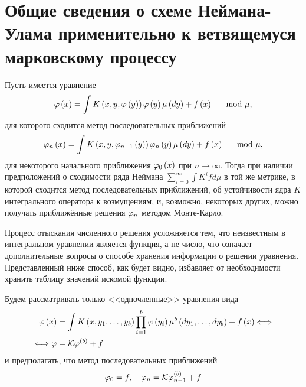 \section{Общие сведения о схеме Неймана-Улама применительно к ветвящемуся марковскому процессу}
Пусть имеется уравнение 
\begin{equation}
	\varphi\left(x\right) = \int K\left(x, y, \varphi\left(y\right)\right)\varphi\left(y\right) \mu\left(dy\right) + f\left(x\right) \quad \mod \mu,
\end{equation}
для которого сходится метод последовательных приближений
\begin{equation}
	\varphi_n\left(x\right) = \int K\left(x, y, \varphi_{n-1}\left(y\right)\right)\varphi_n\left(y\right) \mu\left(dy\right) + f\left(x\right) \quad \mod \mu,
\end{equation}
для некоторого начального приближения $\varphi_0\left(x\right)$ при $n\to\infty$. Тогда при наличии предположений о сходимости ряда Неймана $\sum_{i=0}^\infty \int K^i f d\mu$ в той же метрике, в которой сходится метод последовательных приближений, об устойчивости ядра $K$ интегрального оператора к возмущениям, и, возможно, некоторых других, можно получать приближённые решения $\varphi_n$ методом Монте-Карло.

Процесс отыскания численного решения усложняется тем, что неизвестным в интегральном уравнении является функция, а не число, что означает дополнительные вопросы о способе хранения информации о решении уравнения. Представленный ниже способ, как будет видно, избавляет от необходимости хранить таблицу значений искомой функции.

Будем рассматривать только <<одночленные>> уравнения вида 
\begin{align}
	\varphi\left(x\right) &= \int K\left(x, y_1, \ldots,y_b\right)\prod_{i=1}^b\varphi\left(y_i\right)\mu^b\left(dy_1, \ldots,dy_b\right) + f\left(x\right) \Longleftrightarrow \label{eq:tree-basic}\\
	\Longleftrightarrow \varphi &= \mathcal{K}\varphi^{\left(b\right)} + f \nonumber
\end{align}
и предполагать, что метод последовательных приближений 
\begin{equation}
\label{eq:consecutive-approximations}
\varphi_0 = f, \quad\varphi_n = \mathcal{K}\varphi_{n-1}^{(b)} + f
\end{equation}

